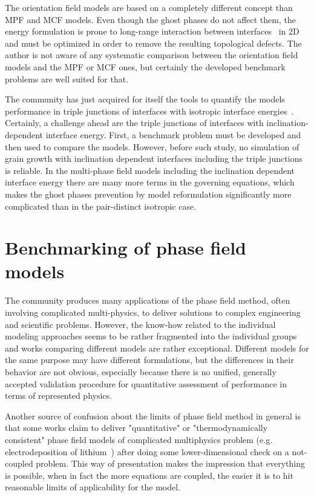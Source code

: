 	The orientation field models are based on a completely different concept than MPF and MCF models. Even though the ghost phases do not affect them, the energy formulation is prone to long-range interaction between interfaces~\cite{Korbuly2017} in 2D and must be optimized in order to remove the resulting topological defects. The author is not aware of any systematic comparison between the orientation field models and the MPF or MCF ones, but certainly the developed benchmark problems are well suited for that.
	
	The community has just acquired for itself the tools to quantify the models performance in triple junctions of interfaces with isotropic interface energies~\cite{Daubner2023}. Certainly, a challenge ahead are the triple junctions of interfaces with inclination-dependent interface energy.	First, a benchmark problem must be developed and then used to compare the models. However, before such study, no simulation of grain growth with inclination dependent interfaces including the triple junctions is reliable. In the multi-phase field models including the inclination dependent interface energy there are many more terms in the governing equations, which makes the ghost phases prevention by model reformulation significantly more complicated than in the pair-distinct isotropic case. 

\section{Benchmarking of phase field models}
The community produces many applications of the phase field method, often involving complicated multi-physics, to deliver solutions to complex engineering and scientific problems. However, the know-how related to the individual modeling approaches seems to be rather fragmented into the individual groups and works comparing different models are rather exceptional. Different models for the same purpose may have different formulations, but the differences in their behavior are not obvious, especially because there is no unified, generally accepted validation procedure for quantitative assessment of performance in terms of represented physics. 

Another source of confusion about the limits of phase field method in general is that some works claim to deliver "quantitative" or "thermodynamically consistent" phase field models of complicated multiphysics problem (e.g. electrodeposition of lithium~\cite{Chen2015}) after doing some lower-dimensional check on a not-coupled problem. This way of presentation makes the impression that everything is possible, when in fact the more equations are coupled, the easier it is to hit reasonable limits of applicability for the model.

